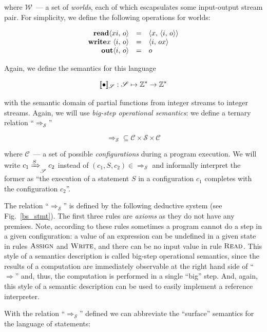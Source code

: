 where $\mathscr W$~--- a set of \emph{worlds}, each of which escapsulates some input-output stream pair. For
simplicity, we define the following operations for worlds:

\[
\begin{array}{rcl}
  \mathbf{read}{\left<{xi,\,o}\right>}    & = & \left<{x,\,\left<{i,\,o}\right>}\right>\\
  \mathbf{write}{x\,\left<{i,\,o}\right>} & = & \left<{i,\,ox}\right>\\
  \mathbf{out}{\left<{i,\,o}\right>}      & = & o
\end{array}
\]


Again, we define the semantics for this language 

\[
\llbracket{\bullet}\rrbracket_{\mathscr S} : \mathscr S \mapsto \mathbb Z^* \to \mathbb Z^*
\]

with the semantic domain of partial functions from integer streams to integer streams. Again, we will
use \emph{big-step operational semantics}: we define a ternary relation ``$\Rightarrow_{\mathscr S}$''

\[
\Rightarrow_{\mathscr S} \subseteq \mathscr C \times \mathscr S \times \mathscr C
\]

where $\mathscr C$~--- a set of possible \emph{configurations} during a program execution.
We will write $c_1\xRightarrow{S}_{\mathscr S}c_2$ instead of $(c_1, S, c_2)\in\Rightarrow_{\mathscr S}$ and informally
interpret the former as ``the execution of a statement $S$ in a configuration $c_1$ completes with the configuration
$c_2$''.

The relation ``$\Rightarrow_{\mathscr S}$'' is defined by the following deductive system (see Fig.~\ref{bs_stmt}). The first
three rules are \emph{axioms} as they do not have any premises. Note, according to these rules sometimes a program
cannot do a step in a given configuration: a value of an expression can be undefined in a given state in rules
$\textsc{Assign}$ and $\textsc{Write}$, and there can be no input value in rule $\textsc{Read}$. This style of
a semantics description is called big-step operational semantics, since the results of a computation are
immediately observable at the right hand side of ``$\Rightarrow$'' and, thus, the computation is performed in
a single ``big'' step. And, again, this style of a semantic description can be used to easily implement a
reference interpreter.

With the relation ``$\Rightarrow_{\mathscr S}$'' defined we can abbreviate the ``surface'' semantics for the language of statements:


